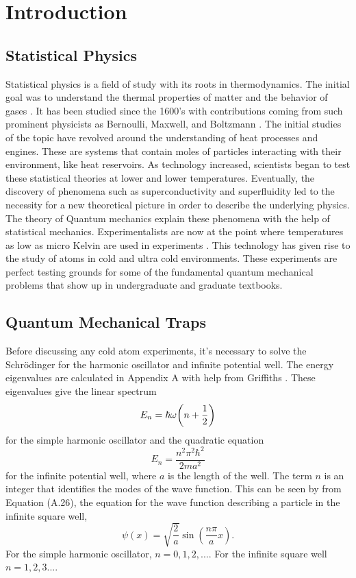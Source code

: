 \chapter{Introduction} \label{ch:introduction}
\section{Statistical Physics}
Statistical physics is a field of study with its roots in thermodynamics. The initial goal was to understand the thermal properties of matter and the behavior of gases \cite{Kardar}. It has been studied since the 1600's with contributions coming from such prominent physicists as Bernoulli, Maxwell, and Boltzmann \cite{Flamm1998}. The initial studies of the topic have revolved around the understanding of heat processes and engines. These are systems that contain moles of particles interacting with their environment, like heat reservoirs. As technology increased, scientists began to test these statistical theories at lower and lower temperatures. Eventually, the discovery of phenomena such as superconductivity and superfluidity led to the necessity for a new theoretical picture in order to describe the underlying physics. The theory of Quantum mechanics explain these phenomena with the help of statistical mechanics. Experimentalists are now at the point where temperatures as low as micro Kelvin are used in experiments \cite{Onofrio2016, Es2010,Bhar}. This technology has given rise to the study of atoms in cold and ultra cold environments. These experiments are perfect testing grounds for some of the fundamental quantum mechanical problems that show up in undergraduate and graduate textbooks. 

\section{Quantum Mechanical Traps}
Before discussing any cold atom experiments, it's necessary to solve the Schr\"odinger for the harmonic oscillator and infinite potential well. The energy eigenvalues are calculated in Appendix A with help from Griffiths \cite{Griffiths}. These eigenvalues give the linear spectrum 
\begin{equation}
    E_n=\hbar\omega\qty(n+\frac{1}{2})
\end{equation}
for the simple harmonic oscillator and the quadratic equation 
\begin{equation}
    E_n=\frac{n^2\pi^2\hbar^2}{2ma^2}
\end{equation}
for the infinite potential well, where $a$ is the length of the well. The term $n$ is an integer that identifies the modes of the wave function. This can be seen by from Equation (A.26), the equation for the wave function describing a particle in the infinite square well,
\begin{equation*}
    \psi(x)=\sqrt{\frac{2}{a}}\sin(\frac{n\pi}{a}x).
\end{equation*}
For the simple harmonic oscillator, $n=0,1,2,...$. For the infinite square well $n=1,2,3...$. 

